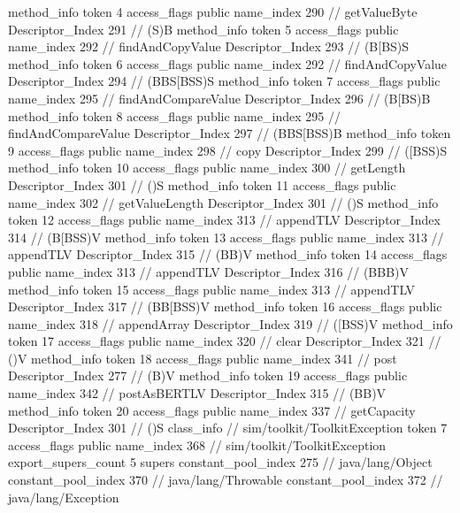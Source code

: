 {{{{{				}
				method_info {
					token	4
					access_flags	public
					name_index	290		// getValueByte
					Descriptor_Index	291		// (S)B
				}
				method_info {
					token	5
					access_flags	public
					name_index	292		// findAndCopyValue
					Descriptor_Index	293		// (B[BS)S
				}
				method_info {
					token	6
					access_flags	public
					name_index	292		// findAndCopyValue
					Descriptor_Index	294		// (BBS[BSS)S
				}
				method_info {
					token	7
					access_flags	public
					name_index	295		// findAndCompareValue
					Descriptor_Index	296		// (B[BS)B
				}
				method_info {
					token	8
					access_flags	public
					name_index	295		// findAndCompareValue
					Descriptor_Index	297		// (BBS[BSS)B
				}
				method_info {
					token	9
					access_flags	public
					name_index	298		// copy
					Descriptor_Index	299		// ([BSS)S
				}
				method_info {
					token	10
					access_flags	public
					name_index	300		// getLength
					Descriptor_Index	301		// ()S
				}
				method_info {
					token	11
					access_flags	public
					name_index	302		// getValueLength
					Descriptor_Index	301		// ()S
				}
				method_info {
					token	12
					access_flags	public
					name_index	313		// appendTLV
					Descriptor_Index	314		// (B[BSS)V
				}
				method_info {
					token	13
					access_flags	public
					name_index	313		// appendTLV
					Descriptor_Index	315		// (BB)V
				}
				method_info {
					token	14
					access_flags	public
					name_index	313		// appendTLV
					Descriptor_Index	316		// (BBB)V
				}
				method_info {
					token	15
					access_flags	public
					name_index	313		// appendTLV
					Descriptor_Index	317		// (BB[BSS)V
				}
				method_info {
					token	16
					access_flags	public
					name_index	318		// appendArray
					Descriptor_Index	319		// ([BSS)V
				}
				method_info {
					token	17
					access_flags	public
					name_index	320		// clear
					Descriptor_Index	321		// ()V
				}
				method_info {
					token	18
					access_flags	public
					name_index	341		// post
					Descriptor_Index	277		// (B)V
				}
				method_info {
					token	19
					access_flags	public
					name_index	342		// postAsBERTLV
					Descriptor_Index	315		// (BB)V
				}
				method_info {
					token	20
					access_flags	public
					name_index	337		// getCapacity
					Descriptor_Index	301		// ()S
				}
			}
		}
		class_info {		// sim/toolkit/ToolkitException
			token	7
			access_flags	public
			name_index	368		// sim/toolkit/ToolkitException
			export_supers_count	5
			supers {
				constant_pool_index	275		// java/lang/Object
				constant_pool_index	370		// java/lang/Throwable
				constant_pool_index	372		// java/lang/Exception
}}}}
